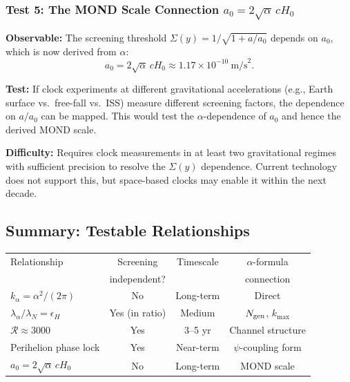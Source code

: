 \documentclass[11pt]{article}
\newcommand{\kalpha}{k_\alpha}
\theoremstyle{definition}
\theoremstyle{remark}
\begin{document}
\subsubsection{Test 5: The MOND Scale Connection $a_0 = 2\sqrt{\alpha}\,cH_0$}

\textbf{Observable:} The screening threshold $\Sigma(y) = 1/\sqrt{1 + a/a_0}$
depends on $a_0$, which is now derived from $\alpha$:
\begin{equation}
a_0 = 2\sqrt{\alpha}\,cH_0 \approx 1.17 \times 10^{-10}~\text{m/s}^2.
\end{equation}

\textbf{Test:} If clock experiments at different gravitational accelerations
(e.g., Earth surface vs.\ free-fall vs.\ ISS) measure different screening
factors, the dependence on $a/a_0$ can be mapped. This would test the
$\alpha$-dependence of $a_0$ and hence the derived MOND scale.

\textbf{Difficulty:} Requires clock measurements in at least two
gravitational regimes with sufficient precision to resolve the $\Sigma(y)$
dependence. Current technology does not support this, but space-based
clocks may enable it within the next decade.

\subsection{Summary: Testable Relationships}

\begin{center}
\renewcommand{\arraystretch}{1.3}
\begin{tabular}{lccc}
\toprule
Relationship & Screening & Timescale & $\alpha$-formula \\
 & independent? & & connection \\
\midrule
$\kalpha = \alpha^2/(2\pi)$ & No & Long-term & Direct \\
$\lambda_\alpha/\lambda_N = \epsilon_H$ & Yes (in ratio) & Medium & $N_{\rm gen}$, $k_{\max}$ \\
$\mathcal{R} \approx 3000$ & Yes & 3--5 yr & Channel structure \\
Perihelion phase lock & Yes & Near-term & $\psi$-coupling form \\
$a_0 = 2\sqrt\alpha\,cH_0$ & No & Long-term & MOND scale \\
\bottomrule
\end{tabular}
\end{center}

\end{document}
